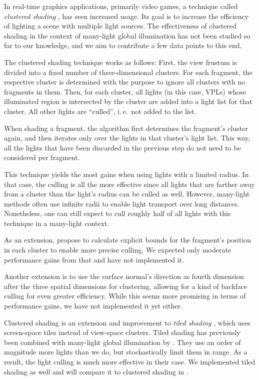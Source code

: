 In real-time graphics applications, primarily video games, a technique called \textit{clustered shading} \citep{olsson2012clustered}, has seen increased usage. Its goal is to increase the efficiency of lighting a scene with multiple light sources.
The effectiveness of clustered shading in the context of many-light global illumination has not been studied so far to our knowledge, and we aim to contribute a few data points to this end.

The clustered shading technique works as follows: First, the view frustum is divided into a fixed number of three-dimensional clusters. For each fragment, the respective cluster is determined with the purpose to ignore all clusters with no fragments in them. Then, for each cluster, all lights (in this case, VPLs) whose illuminated region is intersected by the cluster are added into a light list for that cluster. All other lights are ``culled'', i.\,e.\ not added to the list.

When shading a fragment, the algorithm first determines the fragment's cluster again, and then iterates only over the lights in that cluster's light list. This way, all the lights that have been discarded in the previous step do not need to be considered per fragment.

This technique yields the most gains when using lights with a limited radius. In that case, the culling is all the more effective since all lights that are farther away from a cluster than the light's radius can be culled as well. However, many-light methods often use infinite radii to enable light transport over long distances. Nonetheless, one can still expect to cull roughly half of all lights with this technique in a many-light context.

As an extension, \citet{olsson2012clustered} propose to calculate explicit bounds for the fragment's position in each cluster to enable more precise culling. We expected only moderate performance gains from that and have not implemented it.

Another extension is to use the surface normal's direction as fourth dimension after the three spatial dimensions for clustering, allowing for a kind of backface culling for even greater efficiency. While this seems more promising in terms of performance gains, we have not implemented it yet either.


Clustered shading is an extension and improvement to \textit{tiled shading} \citep{Olsson:2011:TiledShading}, which uses screen-space tiles instead of view-space clusters. Tiled shading has previously been combined with many-light global illumination by \citet{Tokuyoshi:2016:Stochastic}. They use an order of magnitude more lights than we do, but stochastically limit them in range. As a result, the light culling is much more effective in their case.
We implemented tiled shading as well and will compare it to clustered shading in .


